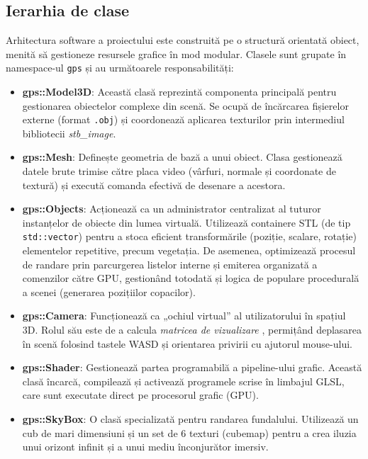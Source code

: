 \documentclass[11pt,a4paper]{article}
\begin{document}
\subsection{Ierarhia de clase}

Arhitectura software a proiectului este construită pe o structură orientată obiect, menită să gestioneze resursele grafice în mod modular. Clasele sunt grupate în namespace-ul \texttt{gps} și au următoarele responsabilități:

\begin{itemize}
    \item \textbf{gps::Model3D}: Această clasă reprezintă componenta principală pentru gestionarea obiectelor complexe din scenă. Se ocupă de încărcarea fișierelor externe (format \texttt{.obj}) și coordonează aplicarea texturilor prin intermediul bibliotecii \textit{stb\_image}.
    
    \item \textbf{gps::Mesh}: Definește geometria de bază a unui obiect. Clasa gestionează datele brute trimise către placa video (vârfuri, normale și coordonate de textură) și execută comanda efectivă de desenare a acestora.
    
    \item \textbf{gps::Objects}: Acționează ca un administrator centralizat al tuturor instanțelor de obiecte din lumea virtuală. Utilizează containere STL (de tip \texttt{std::vector}) pentru a stoca eficient transformările (poziție, scalare, rotație) elementelor repetitive, precum vegetația. De asemenea, optimizează procesul de randare prin parcurgerea listelor interne și emiterea organizată a comenzilor către GPU, gestionând totodată și logica de populare procedurală a scenei (generarea pozițiilor copacilor).
    
    \item \textbf{gps::Camera}: Funcționează ca „ochiul virtual” al utilizatorului în spațiul 3D. Rolul său este de a calcula \textit{matricea de vizualizare} , permițând deplasarea în scenă folosind tastele WASD și orientarea privirii cu ajutorul mouse-ului.
    
    \item \textbf{gps::Shader}: Gestionează partea programabilă a pipeline-ului grafic. Această clasă încarcă, compilează și activează programele scrise în limbajul GLSL, care sunt executate direct pe procesorul grafic (GPU).
    
    \item \textbf{gps::SkyBox}: O clasă specializată pentru randarea fundalului. Utilizează un cub de mari dimensiuni și un set de 6 texturi (cubemap) pentru a crea iluzia unui orizont infinit și a unui mediu înconjurător imersiv.
\end{itemize}
\end{document}
